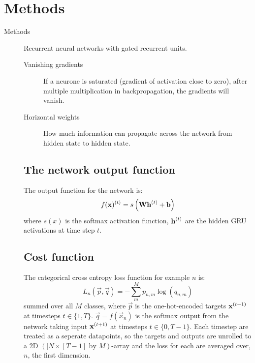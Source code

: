 \section{Methods}
\label{sec:method}

\begin{description}
	\item[Methods] Recurrent neural networks with gated recurrent units.
	
	\begin{description}
		\item[Vanishing gradients] If a neurone is saturated (gradient of activation close to zero), after multiple multiplication in backpropagation, the gradients will vanish.
		\item[Horizontal weights] How much information can propagate across the network from hidden state to hidden state.
	\end{description}
	
	\subsection{The network output function}
	The output function for the network is:
	\begin{equation}
		f(\vec{x})\order{t} = s\left(\vec{W} \vec{h}\order{t} + \vec{b}\right)%
	\end{equation}
	where $s(x)$ is the softmax activation function, $\bm{\mathrm{h}}^{(t)}$ are the hidden GRU activations at time step $t$. 
	\subsection{Cost function} 
	The categorical cross entropy loss function for example $n$ is:
	\begin{equation}
		L_n(\vec{p}, \vec{q}) = -\sum^{M}_{m} p_{n,m} \log (q_{n,m})
	\end{equation}
	summed over all $M$ classes, where $\vec{p}$ is the one-hot-encoded targets $\bm{\mathrm{x}}^{(t+1)}$ at timesteps $t\in\{1, T\}$. $\vec{q}=f(\vec{x}_n)$ is the softmax output from the network taking input $\bm{\mathrm{x}}^{(t+1)}$ at timesteps $t\in\{0, T-1\}$. Each timestep are treated as a seperate datapoints, so the targets and outputs are unrolled to a 2D $([N \times [T-1] \text{ by } M)$-array and the loss for each are averaged over, $n$, the first dimension.


\end{description}

